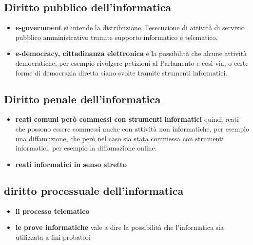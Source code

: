 \subsection{Diritto pubblico dell'informatica}
\begin{itemize}
    \item \textbf{e-government} si intende la distribuzione, l'esecuzione di attività di servizio pubblico amministrativo tramite supporto informatico e telematico.
    \item \textbf{ e-democracy, cittadinanza elettronica} è la possibilità che alcune attività democratiche, per esempio rivolgere petizioni al Parlamento e così via, o certe forme di democrazia diretta siano svolte tramite strumenti informatici. 
\end{itemize}

\subsection{Diritto penale dell'informatica}
\begin{itemize}
    \item \textbf{reati comuni però commessi con strumenti informatici} quindi reati che possono essere commessi anche con attività non informatiche, per esempio una diffamazione, che però nel caso sia stata commessa con strumenti informatici, per esempio la diffamazione online.
    \item \textbf{reati informatici in senso stretto}
\end{itemize}

\subsection{diritto processuale dell'informatica}
\begin{itemize}
    \item \textbf{il processo telematico}
    \item \textbf{le prove informatiche} vale a dire la possibilità che l'informatica sia utilizzata a fini probatori
\end{itemize}